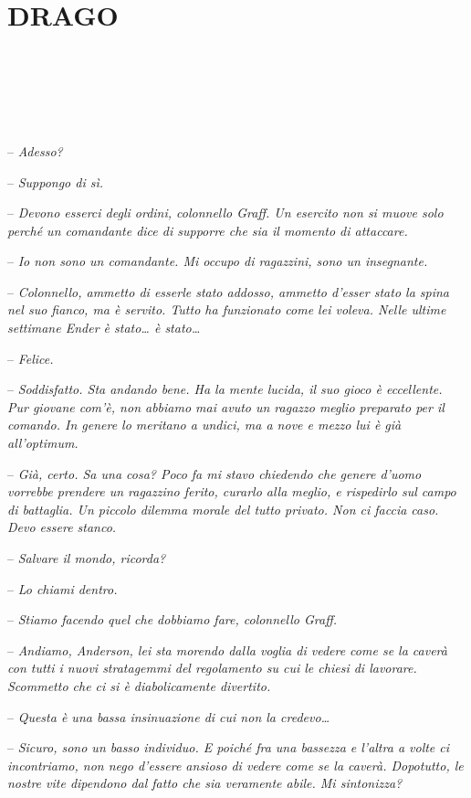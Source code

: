 \chapter{DRAGO}

{~}

{~}

{~}

{-- \emph{Adesso?}}

{-- \emph{Suppongo di sì.}}

{-- \emph{Devono esserci degli ordini, colonnello Graff. Un esercito non
		si muove solo perché un comandante dice di supporre che sia il momento
		di attaccare.}}

{-- \emph{Io non sono un comandante. Mi occupo di ragazzini, sono un
		insegnante.}}

{-- \emph{Colonnello, ammetto di esserle stato addosso, ammetto d'esser
		stato la spina nel suo fianco, ma è servito. Tutto ha funzionato come
		lei voleva. Nelle ultime settimane Ender è stato\ldots{} è
		stato\ldots{}}}

{-- \emph{Felice.}}

{-- \emph{Soddisfatto. Sta andando bene. Ha la mente lucida, il suo
		gioco è eccellente. Pur giovane com'è, non abbiamo mai avuto un ragazzo
		meglio preparato per il comando. In genere lo meritano a undici, ma a
		nove e mezzo lui è già all'optimum.}}

{-- \emph{Già, certo. Sa una cosa? Poco fa mi stavo chiedendo che genere
		d'uomo vorrebbe prendere un ragazzino ferito, curarlo alla meglio, e
		rispedirlo sul campo di battaglia. Un piccolo dilemma morale del tutto
		privato. Non ci faccia caso. Devo essere stanco.}}

{-- \emph{Salvare il mondo, ricorda?}}

{-- \emph{Lo chiami dentro.}}

{-- \emph{Stiamo facendo quel che dobbiamo fare, colonnello Graff.}}

{-- \emph{Andiamo, Anderson, lei sta morendo dalla voglia di vedere come
		se la caverà con tutti i nuovi stratagemmi del regolamento su cui le
		chiesi di lavorare. Scommetto che ci si è diabolicamente divertito.}}

{-- \emph{Questa è una bassa insinuazione di cui non la
		credevo\ldots{}}}

{-- \emph{Sicuro, sono un basso individuo. E poiché fra una bassezza e
		l'altra a volte ci incontriamo, non nego d'essere ansioso di vedere come
		se la caverà. Dopotutto, le nostre vite dipendono dal fatto che sia
		veramente abile. Mi sintonizza?}}

